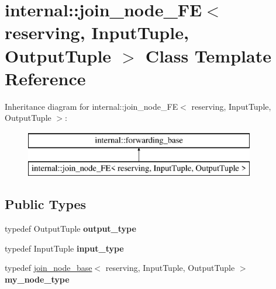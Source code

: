 \hypertarget{classinternal_1_1join__node__FE_3_01reserving_00_01InputTuple_00_01OutputTuple_01_4}{}\section{internal\+:\+:join\+\_\+node\+\_\+\+F\+E$<$ reserving, Input\+Tuple, Output\+Tuple $>$ Class Template Reference}
\label{classinternal_1_1join__node__FE_3_01reserving_00_01InputTuple_00_01OutputTuple_01_4}
Inheritance diagram for internal\+:\+:join\+\_\+node\+\_\+\+F\+E$<$ reserving, Input\+Tuple, Output\+Tuple $>$\+:\begin{figure}[H]
\begin{center}
\leavevmode
\includegraphics[height=2.000000cm]{classinternal_1_1join__node__FE_3_01reserving_00_01InputTuple_00_01OutputTuple_01_4}
\end{center}
\end{figure}
\subsection*{Public Types}
\begin{DoxyCompactItemize}
\item 
\hypertarget{classinternal_1_1join__node__FE_3_01reserving_00_01InputTuple_00_01OutputTuple_01_4_ade05cd19ef9d3d215bf3f4b08f3d1c19}{}typedef Output\+Tuple {\bfseries output\+\_\+type}\label{classinternal_1_1join__node__FE_3_01reserving_00_01InputTuple_00_01OutputTuple_01_4_ade05cd19ef9d3d215bf3f4b08f3d1c19}

\item 
\hypertarget{classinternal_1_1join__node__FE_3_01reserving_00_01InputTuple_00_01OutputTuple_01_4_a278e38e2de45ebc8b88b06d9c4b28352}{}typedef Input\+Tuple {\bfseries input\+\_\+type}\label{classinternal_1_1join__node__FE_3_01reserving_00_01InputTuple_00_01OutputTuple_01_4_a278e38e2de45ebc8b88b06d9c4b28352}

\item 
\hypertarget{classinternal_1_1join__node__FE_3_01reserving_00_01InputTuple_00_01OutputTuple_01_4_a2414c5a922c89d02b71e6f4cb05fa921}{}typedef \hyperlink{classinternal_1_1join__node__base}{join\+\_\+node\+\_\+base}$<$ reserving, Input\+Tuple, Output\+Tuple $>$ {\bfseries my\+\_\+node\+\_\+type}\label{classinternal_1_1join__node__FE_3_01reserving_00_01InputTuple_00_01OutputTuple_01_4_a2414c5a922c89d02b71e6f4cb05fa921}

\end{DoxyCompactItemize}

